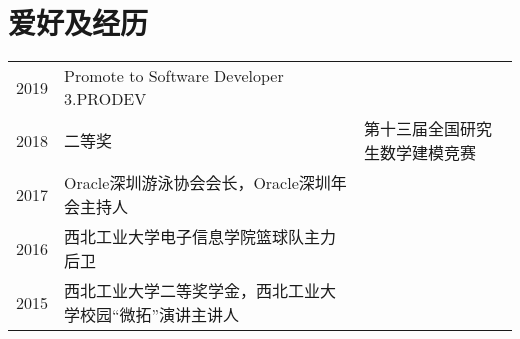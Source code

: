 \documentclass[]{deedy-resume-openfont}
\begin{document}
\begin{minipage}[t]{0.73\textwidth}
\section{爱好及经历} 
\begin{tabular}{rll}
2019       & Promote to Software Developer 3.PRODEV \\
2018	     & 二等奖  & 第十三届全国研究生数学建模竞赛 \\
2017	     & Oracle深圳游泳协会会长，Oracle深圳年会主持人 \\
2016	     & 西北工业大学电子信息学院篮球队主力后卫 \\
2015       & 西北工业大学二等奖学金，西北工业大学校园“微拓”演讲主讲人 \\

\end{tabular}
\sectionsep


% 
% 

\end{minipage} 
\end{document}
